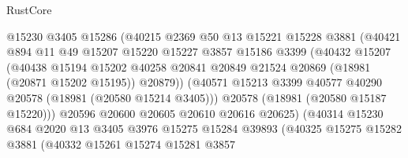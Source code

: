 \begin{lexlean}{RustCore}
\begin{coremodule}
                            @15230
                            @3405
                            @15286
                            (@40215
                              @2369
                              @50
                              @13
                              @15221
                              @15228
                              @3881
                              (@40421
                                @894
                                @11
                                @49
                                @15207
                                @15220
                                @15227
                                @3857
                                @15186
                                @3399
                                (@40432
                                  @15207
                                  (@40438
                                    @15194
                                    @15202
                                    @40258
                                    @20841
                                    @20849
                                    @21524
                                    @20869
                                    (@18981 (@20871 @15202 @15195))
                                    @20879))
                                (@40571
                                  @15213
                                  @3399
                                  @40577
                                  @40290
                                  @20578
                                  (@18981 (@20580 @15214 @3405)))
                                @20578
                                (@18981 (@20580 @15187 @15220)))
                              @20596
                              @20600
                              @20605
                              @20610
                              @20616
                              @20625)
                            (@40314
                              @15230
                              @684
                              @2020
                              @13
                              @3405
                              @3976
                              @15275
                              @15284
                              @39893
                              (@40325
                                @15275
                                @15282
                                @3881
                                (@40332
                                  @15261
                                  @15274
                                  @15281
                                  @3857

\end{coremodule}
\end{lexlean}
